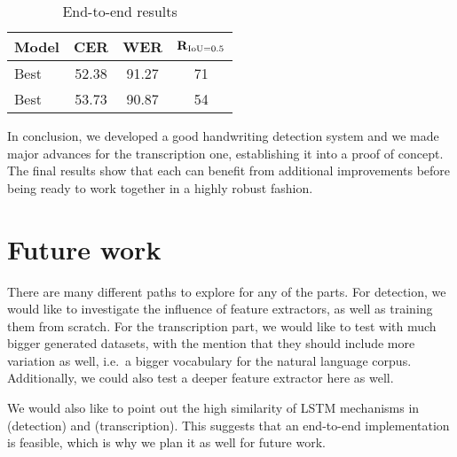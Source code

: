 \begin{table}[htb]
\begin{tabular}{| l | *3{c |}}\hline
	\bf Model     & \bf CER & \bf WER & \(\mathbf{R}_{\operatorname{IoU} = 0.5}\)\\\hline
	Best \FRCNN{} & 52.38   & 91.27   & 71\\
	Best \CTPN{}  & 53.73   & 90.87   & 54\\\hline
\end{tabular}
\caption{End-to-end results}\label{tab:e2e_results}
\end{table}

In conclusion, we developed a good handwriting detection system and we made major advances for the transcription one, establishing it into a proof of concept. The final results show that each can benefit from additional improvements before being ready to work together in a highly robust fashion.

\section{Future work}
There are many different paths to explore for any of the parts. For detection, we would like to investigate the influence of feature extractors, as well as training them from scratch. For the transcription part, we would like to test with much bigger generated datasets, with the mention that they should include more variation as well, i.e.\ a bigger vocabulary for the natural language corpus. Additionally, we could also test a deeper feature extractor here as well.

We would also like to point out the high similarity of LSTM mechanisms in \CTPN{} (detection) and \CRNN{} (transcription). This suggests that an end-to-end implementation is feasible, which is why we plan it as well for future work.

